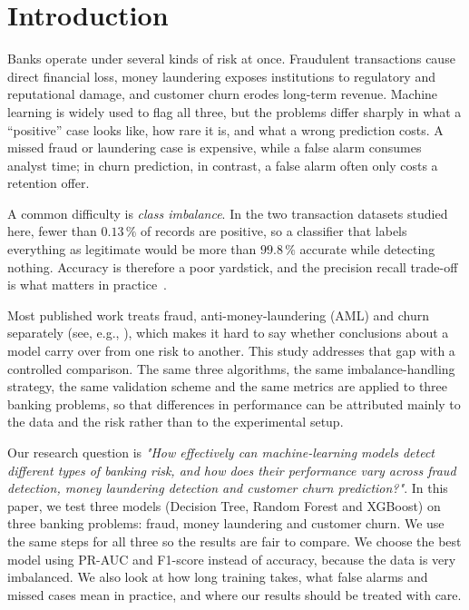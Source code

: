 \documentclass[10pt,twocolumn,a4paper]{article}
\newcommand{\pct}{\,\%}
\begin{document}
\section{Introduction}
Banks operate under several kinds of risk at once. Fraudulent transactions cause direct financial loss, money laundering exposes institutions to regulatory and reputational damage, and customer churn erodes long-term revenue. Machine learning is widely used to flag all three, but the problems differ sharply in what a ``positive'' case looks like, how rare it is, and what a wrong prediction costs. A missed fraud or laundering case is expensive, while a false alarm consumes analyst time; in churn prediction, in contrast, a false alarm often only costs a retention offer.

A common difficulty is \emph{class imbalance}. In the two transaction datasets studied here, fewer than $0.13\pct$ of records are positive, so a classifier that labels everything as legitimate would be more than $99.8\pct$ accurate while detecting nothing. Accuracy is therefore a poor yardstick, and the precision recall trade-off is what matters in practice~\cite{davis2006,saito2015}.

Most published work treats fraud, anti-money-laundering (AML) and churn separately (see, e.g., \cite{mulyana2025,oztas2025,andespa2025}), which makes it hard to say whether conclusions about a model carry over from one risk to another. This study addresses that gap with a controlled comparison. The same three algorithms, the same imbalance-handling strategy, the same validation scheme and the same metrics are applied to three banking problems, so that differences in performance can be attributed mainly to the data and the risk rather than to the experimental setup.

Our research question is \emph{"How effectively can machine-learning models detect different types of banking risk, and how does their performance vary across fraud detection, money laundering detection and customer churn prediction?"}. In this paper, we test three models (Decision Tree, Random Forest and XGBoost) on three banking problems: fraud, money laundering and customer churn. We use the same steps for all three so the results are fair to compare. We choose the best model using PR-AUC and F1-score instead of accuracy, because the data is very imbalanced. We also look at how long training takes, what false alarms and missed cases mean in practice, and where our results should be treated with care.
\end{document}
